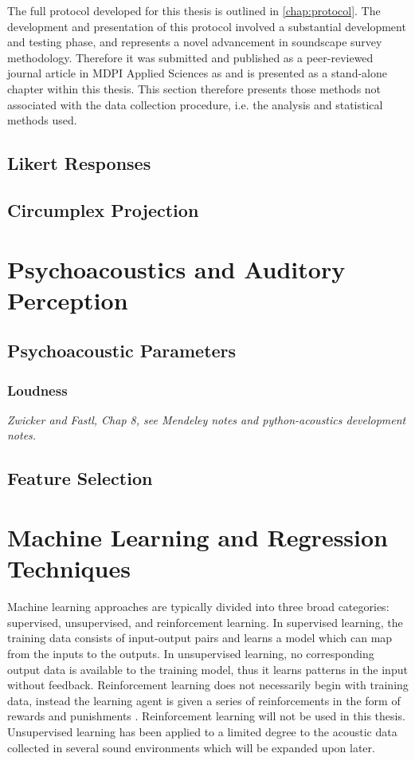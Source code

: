  The full protocol developed for this thesis is outlined in \cref{chap:protocol}. The development and presentation of this protocol involved a substantial development and testing phase, and represents a novel advancement in soundscape survey methodology. Therefore it was submitted and published as a peer-reviewed journal article in MDPI Applied Sciences as \citet{Mitchell2020Soundscape} and is presented as a stand-alone chapter within this thesis. This section therefore presents those methods not associated with the data collection procedure, i.e. the analysis and statistical methods used.

 \subsection{Likert Responses}

 \subsection{Circumplex Projection}

\section{Psychoacoustics and Auditory Perception}

 \subsection{Psychoacoustic Parameters}

   \subsubsection{Loudness}
   \emph{Zwicker and Fastl, Chap 8, see Mendeley notes and python-acoustics development notes.}
 \subsection{Feature Selection}

\section{Machine Learning and Regression Techniques}
Machine learning approaches are typically divided into three broad categories: supervised, unsupervised, and reinforcement learning. In supervised learning, the training data consists of input-output pairs and learns a model which can map from the inputs to the outputs. In unsupervised learning, no corresponding output data is available to the training model, thus it learns patterns in the input without feedback. Reinforcement learning does not necessarily begin with training data, instead the learning agent is given a series of reinforcements in the form of rewards and punishments \citep{StuartRussell2021}. Reinforcement learning will not be used in this thesis. Unsupervised learning has been applied to a limited degree to the acoustic data collected in several sound environments which will be expanded upon later. 


